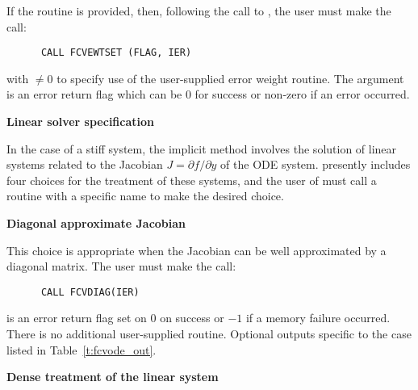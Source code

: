 \begin{Steps}
  If the  routine is provided, then, 
  following the call to , the user must make the call:
\begin{verbatim}
      CALL FCVEWTSET (FLAG, IER)
\end{verbatim}
  with  $\neq 0$ to specify use of the user-supplied error weight routine.
  The argument  is an error return flag which can be $0$ 
  for success or non-zero if an error occurred.

\item\label{i:fcvode_lin_solv_spec} {\bf Linear solver specification} 
  
  In the case of a stiff system, the implicit  method involves the solution
  of linear systems related to the Jacobian $J = \partial f / \partial y$
  of the ODE system.  {\cvode} presently includes four choices for the treatment
  of these systems, and the user of {\fcvode} must call a routine with a
  specific name to make the desired choice.


  {\s} {\bf Diagonal approximate Jacobian}
  
  This choice is appropriate when the Jacobian can be well approximated by
  a diagonal matrix.  The user must make the call:
\begin{verbatim}
      CALL FCVDIAG(IER)
\end{verbatim}
   is an error return flag set on $0$ on success or $-1$ if a memory 
  failure occurred.
  There is no additional user-supplied routine. Optional outputs specific
  to the {\diag} case listed in Table~\ref{t:fcvode_out}.
  

  {\s} {\bf Dense treatment of the linear system}
  

\end{Steps}
